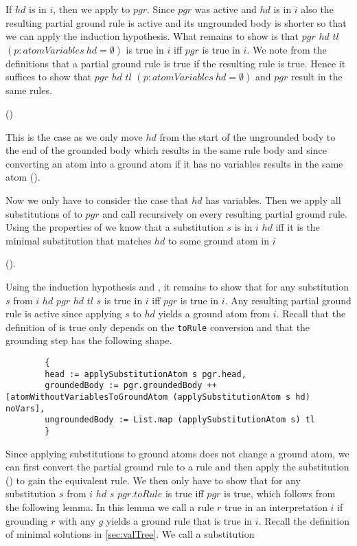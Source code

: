     If $hd$ is in $i$, then we apply \moveAtomWithoutVariables to $pgr$. Since $pgr$ was active and $hd$ is in $i$ also the resulting partial ground rule is active and its ungrounded body is shorter so that we can apply the induction hypothesis. What remains to show is that \moveAtomWithoutVariables $pgr$ $hd$ $tl$ $(p: atomVariables\ hd = \emptyset)$ is true in $i$ iff $pgr$ is true in $i$. We note from the definitions that a partial ground rule is true if the resulting rule is true. Hence it suffices to show that \moveAtomWithoutVariables $pgr$ $hd$ $tl$ $(p: atomVariables\ hd = \emptyset)$ and $pgr$ result in the same rules.
    
    (\partialGroundRuleisTrueofequaltoRule)
    
    This is the case as we only move $hd$ from the start of the ungrounded body to the end of the grounded body which results in the same rule body and since converting an atom into a ground atom if it has no variables results in the same atom (\groundAtomToAtomOfAtomWithoutVariablesToGroundAtomIsSelf).

    Now we only have to consider the case that $hd$ has variables. Then we apply all substitutions of \getSubstitutions to $pgr$ and call \exploreGrounding recursively on every resulting partial ground rule. Using the properties of \matchAtom we know that a substitution $s$ is in \getSubstitutions $i$ $hd$ iff it is the minimal substitution that matches $hd$ to some ground atom in $i$ 
    
    (\inGetSubstitutionsIffMinimalSolutionAndInInterpretation).

    Using the induction hypothesis and \ListmapexceptunitIsUnitIffAll, it remains to show that for any substitution $s$ from \getSubstitutions $i$ $hd$ \groundingStep $pgr$ $hd$ $tl$ $s$ is true in $i$ iff $pgr$ is true in $i$. Any resulting partial ground rule is active since applying $s$ to $hd$ yields a ground atom from $i$. Recall that the definition of is true only depends on the \lstinline|toRule| conversion and that the grounding step has the following shape.

    \begin{lstlisting}
        {
        head := applySubstitutionAtom s pgr.head,
        groundedBody := pgr.groundedBody ++ [atomWithoutVariablesToGroundAtom (applySubstitutionAtom s hd) noVars],
        ungroundedBody := List.map (applySubstitutionAtom s) tl
        }
    \end{lstlisting}

    Since applying substitutions to ground atoms does not change a ground atom, we can first convert the partial ground rule to a rule and then apply the substitution (\swapPgrApplySubstitution) to gain the equivalent rule. We then only have to show that for any substitution $s$ from \getSubstitutions $i$ $hd$ \applySubstitutionRule $s$ $pgr.toRule$ is true iff $pgr$ is true, which follows from the following lemma. In this lemma we call a rule $r$ true in an interpretation $i$ if grounding $r$ with any $g$ yields a ground rule that is true in $i$. Recall the definition of minimal solutions in \cref{sec:valTree}. We call a substitution 

